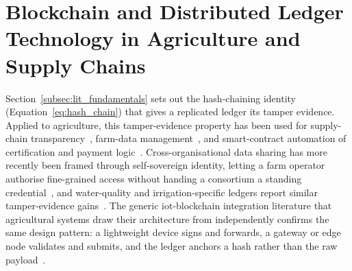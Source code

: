 \documentclass[12pt,a4paper,oneside]{book}
\begin{document}
\section{Blockchain and Distributed Ledger Technology in Agriculture and
Supply Chains}
\label{subsec:lit_blockchain_ag}

Section~\ref{subsec:lit_fundamentals} sets out the hash-chaining identity
(Equation~\ref{eq:hash_chain}) that gives a replicated ledger its tamper
evidence. Applied to agriculture, this tamper-evidence property has been
used for supply-chain
transparency~\cite{tian2016agri, kamilaris2019rise, oh2025foodsafety, galvez2018future, tian2017traceability, reyna2018blockchain, tian2017agri, anonndsupplychain}, farm-data
management~\cite{lin2018blockchain, ferrag2020security, haque2024scalable, zhang2019blockchain, ali2023farmDataTampering}, and smart-contract
automation of certification and payment
logic~\cite{rama2021systematic, patil2022blockchain, nguyen2022smartFarmingSC, tian2017agri}. Cross-organisational data
sharing has more recently been framed through self-sovereign identity,
letting a farm operator authorise fine-grained access without handing a
consortium a standing credential~\cite{amraouy2025ssi}, and water-quality
and irrigation-specific ledgers report similar tamper-evidence
gains~\cite{saito2025blockchainWaterQuality, arshad2022blockchainBenefits, ali2023farmDataTampering, rahman2019agriSecurity}. The generic \gls{iot}-blockchain integration
literature that agricultural systems draw their architecture from
independently confirms the same design pattern: a lightweight device signs
and forwards, a gateway or edge node validates and submits, and the ledger
anchors a hash rather than the raw
payload~\cite{dorri2017blockchain, nguyen2019blockchain, xu2020making, reyna2018blockchain, benedict2021decentralized}.
\end{document}
